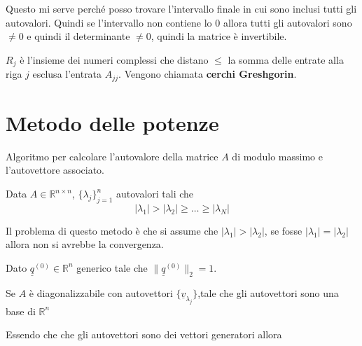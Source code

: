 Questo mi serve perché posso trovare l'intervallo finale in cui sono inclusi tutti 
gli autovalori. Quindi se l'intervallo non contiene lo $0$ allora tutti gli autovalori 
sono $\ne 0$ e quindi il determinante $\ne 0$, quindi la matrice è invertibile.

\begin{nota}
    $R_j$ è l'insieme dei numeri complessi che distano $\le$ la somma delle entrate 
    alla riga $j$ esclusa l'entrata $A_{jj}$. Vengono chiamata \textbf{cerchi Greshgorin}.
\end{nota}

\section{Metodo delle potenze}
Algoritmo per calcolare l'autovalore della matrice $A$ di modulo massimo e l'autovettore 
associato.

Data $A\in \mathbb{R}^{n\times n}$, $\{\lambda_j\}^n_{j=1}$ autovalori tali che 
$$|\lambda_1|> |\lambda_2| \ge \dots \ge |\lambda_N|$$

Il problema di questo metodo è che si assume che $|\lambda_1|> |\lambda_2|$, 
se fosse $|\lambda_1| = |\lambda_2|$ allora non si avrebbe la convergenza. 

Dato $\underline{q}^{(0)}\in \mathbb{R}^n$ generico tale che $\|\underline{q}^{(0)}\|_2=1$.


\begin{nota}
    Se $A$ è diagonalizzabile con autovettori $\{\underline{v}_{\lambda_j}\}$,tale che 
    gli autovettori sono una base di $\mathbb{R}^n$
\end{nota}

Essendo che che gli autovettori sono dei vettori generatori allora 